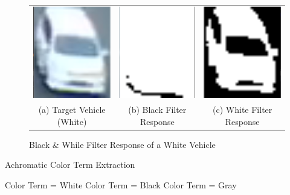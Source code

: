 \begin{figure}[htb!]
  \centering
\begin{tabular}{ccc}
 \includegraphics[width=0.22\linewidth]{image/retrievalOne/whitefilter1.png}   &
 \includegraphics[width=0.22\linewidth]{image/retrievalOne/whitefilter2.png}   &
 \includegraphics[width=0.22\linewidth]{image/retrievalOne/whitefilter3.png}   \\
(a) Target Vehicle (White) &
(b) Black Filter Response &
(c) White Filter Response \\
\end{tabular}
\caption{Black \& While Filter Response of a White Vehicle} \label{fig:blackwhite_filter}
\end{figure}




 \begin{algorithm}[!ht]
  \caption{Achromatic Color Term Extraction}
  \label{algo:achromatic}
  \begin{algorithmic}[1]
  
	\State Color Term = White  	
  	\State Color Term = Black
  \Else
  	\State Color Term = Gray
  \EndIf
  
  \end{algorithmic}
\end{algorithm}

